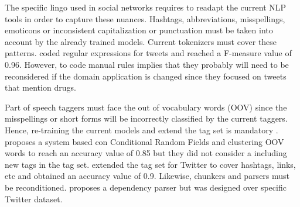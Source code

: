 The specific lingo used in social networks requires to readapt the current NLP tools in order to capture these nuances. Hashtags, abbreviations, misspellings, emoticons or inconsistent capitalization or punctuation must be taken into account by the already trained models. Current tokenizers must cover these patterns. \citep{Nikfarjam2015} coded regular expressions for tweets and reached a F-measure value of 0.96. However, to code manual rules implies that they probably will need to be reconsidered if the domain application is changed since they focused on tweets that mention drugs.
\par Part of speech taggers must face the out of vocabulary words (OOV) since the misspellings or short forms will be incorrectly classified by the current taggers. Hence, re-training the current models and extend the tag set is mandatory \citep{synthesisLecturesSocial}. \citep{stanfordTwitterPosTagger} proposes a system based con Conditional Random Fields and clustering OOV words to reach an accuracy value of 0.85 but they did not consider a including new tags in the tag set. \citep{gimpelPosSetExtended} extended the tag set for Twitter to cover hashtags, links, etc and obtained an accuracy value of 0.9. Likewise, chunkers and parsers must be reconditioned. \citep{khanParserAdaptation} proposes a dependency parser but was designed over specific Twitter dataset.
	
		

